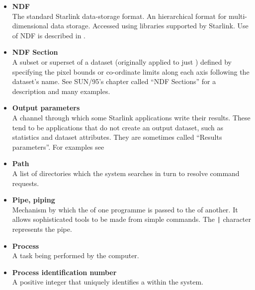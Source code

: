 \documentclass[twoside,11pt,nolof]{starlink}
\providecommand{\latexelsehtml}[2]{#1}
\providecommand{\NDFrefa}[1]{\xref{#1}{sun33}{}}
\begin{document}
\begin{itemize}
\item {\bf\label{sc4_gl_ndf}NDF}\\
      The standard Starlink data-storage format.  An hierarchical format for
      multi-dimensional data storage.  Accessed using libraries supported
      by Starlink.  Use of NDF is described in \NDFrefa{SUN/33}.

\item {\bf\label{sc4_gl_ndf_se}NDF Section}\\
      A subset or superset of a dataset (originally applied to just
      ) defined by specifying the pixel bounds
      or co-ordinate limits along each axis following the dataset's name.
      See \latexelsehtml{SUN/95's chapter called ``NDF
      Sections''}{\xref{here}{sun95}{se_ndfsect}} for a description
      and many examples.

\item {\bf\label{sc4_gl_opar}Output parameters}\\
      A channel through which some Starlink applications write their
      results.  These tend to be applications that do not create an
      output dataset, such as statistics and dataset attributes.  They
      are sometimes called ``Results parameters''.  For examples see
\begin{htmlonly}
\end{htmlonly}

\item {\bf\label{sc4_gl_path}Path}\\
      A list of directories which the system searches in turn to
      resolve command requests.

\item {\bf\label{sc4_gl_pipe}Pipe, piping}\\
      Mechanism by which the 
      of one programme is passed to the  of another.  It allows sophisticated tools
      to be made from simple commands.  The \texttt{|} character
      represents the pipe.

\item {\bf\label{sc4_gl_pro}Process}\\
      A task being performed by the computer.

\item {\bf\label{sc4_gl_pid}Process identification number}\\
      A positive integer that uniquely identifies a
       within the system.


\end{itemize}
\end{document}
